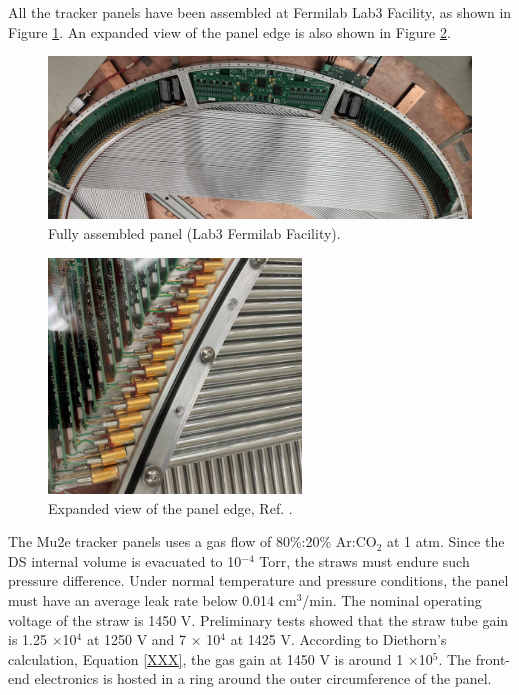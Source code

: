 All the tracker panels have been assembled at Fermilab Lab3 
Facility, as shown in Figure \ref{fig:gonzalo}. An expanded view 
of the panel edge is also shown in Figure \ref{fig:strawtubes}.
            \begin{figure}[!h]
                \centering
                \includegraphics[width =\textwidth]{figures/png/image.png}
                \caption{Fully assembled panel (Lab3 Fermilab Facility).}
                \label{fig:gonzalo}
                \end{figure}
                \begin{figure}[!h]
                    \centering
                    \includegraphics[width =0.6\textwidth]{figures/png/Screenshot_20240327_000131.png}
                    \caption{Expanded view of the panel edge, Ref. \cite{trk}.}
                    \label{fig:strawtubes}
                    \end{figure}
            The Mu2e tracker panels uses a gas flow of 80\%:20\% Ar:CO$_2$ at 1 atm.
            Since the DS internal volume is evacuated to 10$^{-4}$ Torr, 
            the straws must endure such pressure difference. Under normal temperature and 
            pressure conditions, the panel must have an average leak rate below 0.014 cm$^3$/min.  
            The nominal operating voltage of the straw is 1450 V. 
            Preliminary tests showed that the straw 
            tube gain is 1.25 $\times$10$^4$ at 1250 V and 7 $\times$ 10$^4$ at 
            1425 V. According to Diethorn's calculation, Equation \ref{XXX}, 
            the gas gain at 1450 V is around 1 $\times$10$^5$.
            The front-end electronics is hosted in a ring around the outer circumference of the panel. 

